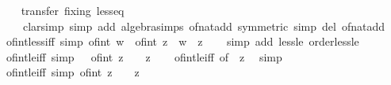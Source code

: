 \begin{isabellebody}
%
\isadelimproof
\ \ %
\endisadelimproof
%
\isatagproof
{}\isamarkupfalse%
\ {\isacharparenleft}{\kern0pt}transfer\ fixing{\isacharcolon}{\kern0pt}\ less{\isacharunderscore}{\kern0pt}eq{\isacharparenright}{\kern0pt}\isanewline
\ \ \ \ {\isacharparenleft}{\kern0pt}clarsimp\ simp\ add{\isacharcolon}{\kern0pt}\ algebra{\isacharunderscore}{\kern0pt}simps\ of{\isacharunderscore}{\kern0pt}nat{\isacharunderscore}{\kern0pt}add\ {\isacharbrackleft}{\kern0pt}symmetric{\isacharbrackright}{\kern0pt}\ simp\ del{\isacharcolon}{\kern0pt}\ of{\isacharunderscore}{\kern0pt}nat{\isacharunderscore}{\kern0pt}add{\isacharparenright}{\kern0pt}%
\endisatagproof
{\isafoldproof}%
%
\isadelimproof
\isanewline
%
\endisadelimproof
\isanewline
{}\isamarkupfalse%
\ of{\isacharunderscore}{\kern0pt}int{\isacharunderscore}{\kern0pt}less{\isacharunderscore}{\kern0pt}iff\ {\isacharbrackleft}{\kern0pt}simp{\isacharbrackright}{\kern0pt}{\isacharcolon}{\kern0pt}\ {\isachardoublequoteopen}of{\isacharunderscore}{\kern0pt}int\ w\ {\isacharless}{\kern0pt}\ of{\isacharunderscore}{\kern0pt}int\ z\ {\isasymlongleftrightarrow}\ w\ {\isacharless}{\kern0pt}\ z{\isachardoublequoteclose}\isanewline
%
\isadelimproof
\ \ %
\endisadelimproof
%
\isatagproof
{}\isamarkupfalse%
\ {\isacharparenleft}{\kern0pt}simp\ add{\isacharcolon}{\kern0pt}\ less{\isacharunderscore}{\kern0pt}le\ order{\isacharunderscore}{\kern0pt}less{\isacharunderscore}{\kern0pt}le{\isacharparenright}{\kern0pt}%
\endisatagproof
{\isafoldproof}%
%
\isadelimproof
\isanewline
%
\endisadelimproof
\isanewline
{}\isamarkupfalse%
\ of{\isacharunderscore}{\kern0pt}int{\isacharunderscore}{\kern0pt}{}{\isacharunderscore}{\kern0pt}le{\isacharunderscore}{\kern0pt}iff\ {\isacharbrackleft}{\kern0pt}simp{\isacharbrackright}{\kern0pt}{\isacharcolon}{\kern0pt}\ {\isachardoublequoteopen}{}\ {\isasymle}\ of{\isacharunderscore}{\kern0pt}int\ z\ {\isasymlongleftrightarrow}\ {}\ {\isasymle}\ z{\isachardoublequoteclose}\isanewline
%
\isadelimproof
\ \ %
\endisadelimproof
%
\isatagproof
{}\isamarkupfalse%
\ of{\isacharunderscore}{\kern0pt}int{\isacharunderscore}{\kern0pt}le{\isacharunderscore}{\kern0pt}iff\ {\isacharbrackleft}{\kern0pt}of\ {}\ z{\isacharbrackright}{\kern0pt}\ \isamarkupfalse%
\ simp%
\endisatagproof
{\isafoldproof}%
%
\isadelimproof
\isanewline
%
\endisadelimproof
\isanewline
{}\isamarkupfalse%
\ of{\isacharunderscore}{\kern0pt}int{\isacharunderscore}{\kern0pt}le{\isacharunderscore}{\kern0pt}{}{\isacharunderscore}{\kern0pt}iff\ {\isacharbrackleft}{\kern0pt}simp{\isacharbrackright}{\kern0pt}{\isacharcolon}{\kern0pt}\ {\isachardoublequoteopen}of{\isacharunderscore}{\kern0pt}int\ z\ {\isasymle}\ {}\ {\isasymlongleftrightarrow}\ z\ {\isasymle}\ {}{\isachardoublequoteclose}\isanewline

\end{isabellebody}
